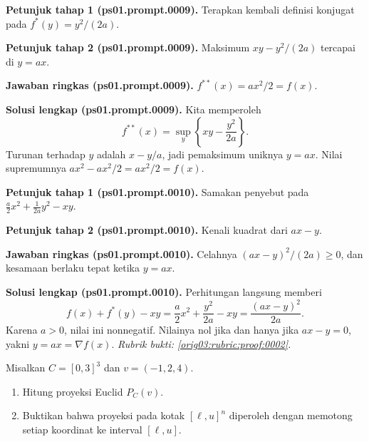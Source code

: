 \par\noindent\textbf{Petunjuk tahap 1 (ps01.prompt.0009).}
Terapkan kembali definisi konjugat pada $f^*(y)=y^2/(2a)$.
\label{orig03:ps01:hint1:0009}
\par\noindent\textbf{Petunjuk tahap 2 (ps01.prompt.0009).}
Maksimum $xy-y^2/(2a)$ tercapai di $y=ax$.
\label{orig03:ps01:hint2:0009}
\par\noindent\textbf{Jawaban ringkas (ps01.prompt.0009).}
$f^{**}(x)=ax^2/2=f(x)$.
\label{orig03:ps01:answer:0009}
\par\noindent\textbf{Solusi lengkap (ps01.prompt.0009).}
Kita memperoleh
\[
 f^{**}(x)=\sup_y\left\{xy-\frac{y^2}{2a}\right\}.
\]
Turunan terhadap $y$ adalah $x-y/a$, jadi pemaksimum uniknya $y=ax$.
Nilai supremumnya $a x^2-a x^2/2=a x^2/2=f(x)$.
\label{orig03:ps01:solution:0009}

\par\noindent\textbf{Petunjuk tahap 1 (ps01.prompt.0010).}
Samakan penyebut pada $\tfrac a2x^2+\tfrac1{2a}y^2-xy$.
\label{orig03:ps01:hint1:0010}
\par\noindent\textbf{Petunjuk tahap 2 (ps01.prompt.0010).}
Kenali kuadrat dari $ax-y$.
\label{orig03:ps01:hint2:0010}
\par\noindent\textbf{Jawaban ringkas (ps01.prompt.0010).}
Celahnya $(ax-y)^2/(2a)\geq0$, dan kesamaan berlaku tepat ketika $y=ax$.
\label{orig03:ps01:answer:0010}
\par\noindent\textbf{Solusi lengkap (ps01.prompt.0010).}
Perhitungan langsung memberi
\[
 f(x)+f^*(y)-xy
 =\frac a2x^2+\frac{y^2}{2a}-xy
 =\frac{(ax-y)^2}{2a}.
\]
Karena $a>0$, nilai ini nonnegatif. Nilainya nol jika dan hanya jika
$ax-y=0$, yakni $y=ax=\nabla f(x)$.
\emph{Rubrik bukti: \ref{orig03:rubric:proof:0002}.}
\label{orig03:ps01:solution:0010}

\begin{exercise}
\label{orig03:ps01:problem:0005}
Misalkan $C=[0,3]^3$ dan $v=(-1,2,4)$.
\begin{enumerate}
\item\label{orig03:ps01:prompt:0011}
Hitung proyeksi Euclid $P_C(v)$.
\item\label{orig03:ps01:prompt:0012}
Buktikan bahwa proyeksi pada kotak $[\ell,u]^n$ diperoleh dengan memotong
setiap koordinat ke interval $[\ell,u]$.
\end{enumerate}
\end{exercise}

